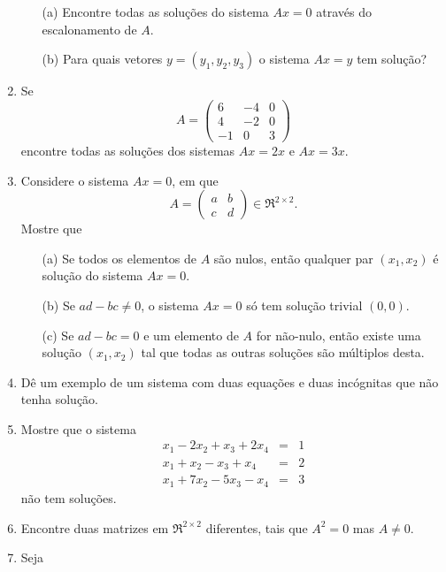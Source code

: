 \documentclass[12pt]{article}
\begin{document}
\begin{enumerate}
   \begin{itemize}
      \item[(a)] Encontre todas as soluções do sistema $Ax=0$ através do escalonamento de $A$.
      \item[(b)] Para quais vetores $y = (y_1,y_2,y_3)$ o sistema $Ax=y$ tem solução? 
   \end{itemize}
%
   \item Se 
   \begin{equation*}
      A =
      \begin{pmatrix}
         6 & -4 & 0\\
         4 & -2 & 0\\
         -1 & 0 & 3
      \end{pmatrix}
   \end{equation*}
   encontre todas as soluções dos sistemas $Ax=2x$ e $Ax=3x$. 
%
   \item Considere o sistema $Ax=0$, em que
   \begin{equation*}
      A = 
      \begin{pmatrix}
         a & b\\
         c & d
      \end{pmatrix}
      \in \Re^{2\times 2}.
   \end{equation*}
   Mostre que
   \begin{itemize}
      \item[(a)] Se todos os elementos de $A$ são nulos, então qualquer par $(x_1,x_2)$ é solução do sistema $Ax=0$.
      \item[(b)] Se $ad-bc \ne 0$, o sistema $Ax=0$ só tem solução trivial $(0,0)$.
      \item[(c)] Se $ad-bc=0$ e um elemento de $A$ for não-nulo, então existe uma solução $(x_1,x_2)$ tal que todas as outras soluções são múltiplos desta.
   \end{itemize}
%
   \item Dê um exemplo de um sistema com duas equações e duas incógnitas que não tenha solução.
%
   \item Mostre que o sistema
   \begin{eqnarray*}
      x_1-2x_2+x_3+2x_4 &=&1\\
      x_1+x_2-x_3+x_4 &=&2\\
      x_1+7x_2-5x_3-x_4 &=&3
   \end{eqnarray*}
   não tem soluções.
%
   \item Encontre duas matrizes em $\Re^{2\times 2}$ diferentes, tais que $A^2=0$ mas $A\ne 0$.
%
   \item Seja 

\end{enumerate}
\end{document}
